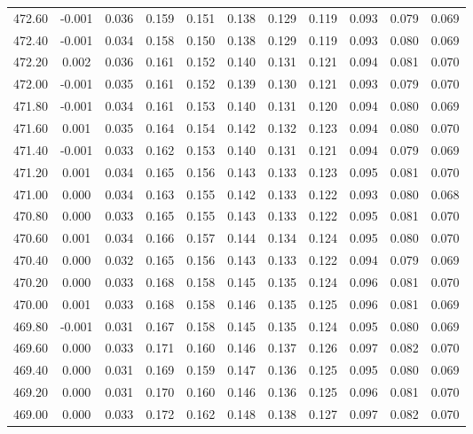 \begin{longtable}{cccccccccc}
    472.60 & -0.001 &  0.036 &  0.159 &  0.151 &  0.138 &  0.129 &  0.119 &  0.093 &  0.079 &  0.069 \\
    472.40 & -0.001 &  0.034 &  0.158 &  0.150 &  0.138 &  0.129 &  0.119 &  0.093 &  0.080 &  0.069 \\
    472.20 &  0.002 &  0.036 &  0.161 &  0.152 &  0.140 &  0.131 &  0.121 &  0.094 &  0.081 &  0.070 \\
    472.00 & -0.001 &  0.035 &  0.161 &  0.152 &  0.139 &  0.130 &  0.121 &  0.093 &  0.079 &  0.070 \\
    471.80 & -0.001 &  0.034 &  0.161 &  0.153 &  0.140 &  0.131 &  0.120 &  0.094 &  0.080 &  0.069 \\
    471.60 &  0.001 &  0.035 &  0.164 &  0.154 &  0.142 &  0.132 &  0.123 &  0.094 &  0.080 &  0.070 \\
    471.40 & -0.001 &  0.033 &  0.162 &  0.153 &  0.140 &  0.131 &  0.121 &  0.094 &  0.079 &  0.069 \\
    471.20 &  0.001 &  0.034 &  0.165 &  0.156 &  0.143 &  0.133 &  0.123 &  0.095 &  0.081 &  0.070 \\
    471.00 &  0.000 &  0.034 &  0.163 &  0.155 &  0.142 &  0.133 &  0.122 &  0.093 &  0.080 &  0.068 \\
    470.80 &  0.000 &  0.033 &  0.165 &  0.155 &  0.143 &  0.133 &  0.122 &  0.095 &  0.081 &  0.070 \\
    470.60 &  0.001 &  0.034 &  0.166 &  0.157 &  0.144 &  0.134 &  0.124 &  0.095 &  0.080 &  0.070 \\
    470.40 &  0.000 &  0.032 &  0.165 &  0.156 &  0.143 &  0.133 &  0.122 &  0.094 &  0.079 &  0.069 \\
    470.20 &  0.000 &  0.033 &  0.168 &  0.158 &  0.145 &  0.135 &  0.124 &  0.096 &  0.081 &  0.070 \\
    470.00 &  0.001 &  0.033 &  0.168 &  0.158 &  0.146 &  0.135 &  0.125 &  0.096 &  0.081 &  0.069 \\
    469.80 & -0.001 &  0.031 &  0.167 &  0.158 &  0.145 &  0.135 &  0.124 &  0.095 &  0.080 &  0.069 \\
    469.60 &  0.000 &  0.033 &  0.171 &  0.160 &  0.146 &  0.137 &  0.126 &  0.097 &  0.082 &  0.070 \\
    469.40 &  0.000 &  0.031 &  0.169 &  0.159 &  0.147 &  0.136 &  0.125 &  0.095 &  0.080 &  0.069 \\
    469.20 &  0.000 &  0.031 &  0.170 &  0.160 &  0.146 &  0.136 &  0.125 &  0.096 &  0.081 &  0.070 \\
    469.00 &  0.000 &  0.033 &  0.172 &  0.162 &  0.148 &  0.138 &  0.127 &  0.097 &  0.082 &  0.070 \\

\end{longtable}
